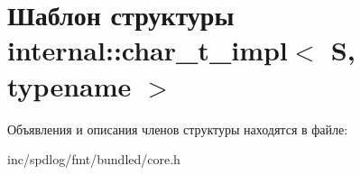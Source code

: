 \hypertarget{structinternal_1_1char__t__impl}{}\section{Шаблон структуры internal\+:\+:char\+\_\+t\+\_\+impl$<$ S, typename $>$}
\label{structinternal_1_1char__t__impl}


Объявления и описания членов структуры находятся в файле\+:\begin{DoxyCompactItemize}
\item 
inc/spdlog/fmt/bundled/core.\+h\end{DoxyCompactItemize}
